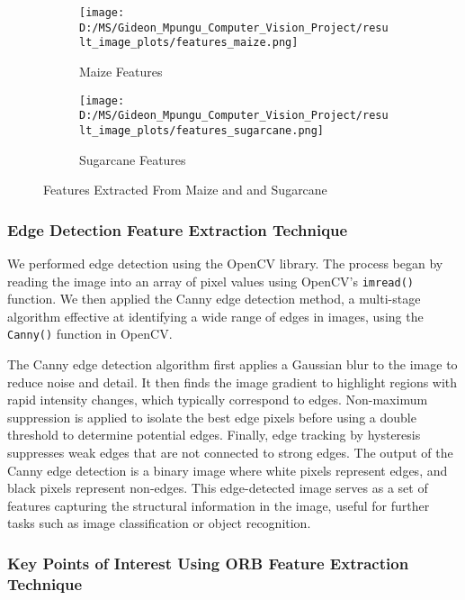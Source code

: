 \documentclass[10pt,twocolumn,letterpaper]{article}
\begin{document}
\begin{figure*}[ht]
    \centering
    
    \begin{subfigure}{0.45\textwidth}
        \texttt{[image: D:/MS/Gideon\_Mpungu\_Computer\_Vision\_Project/result\_image\_plots/features\_maize.png]}
        \caption{Maize Features}
        \label{fig:maize}
    \end{subfigure}
    \hfill
    \begin{subfigure}{0.45\textwidth}
        \texttt{[image: D:/MS/Gideon\_Mpungu\_Computer\_Vision\_Project/result\_image\_plots/features\_sugarcane.png]}
        \caption{Sugarcane Features}
        \label{fig:sugarcane}
    \end{subfigure}
    
    \caption{Features Extracted From Maize and and Sugarcane}
    \label{fig:features}
\end{figure*}

\subsubsection{Edge Detection Feature Extraction Technique}

We performed edge detection using the OpenCV library. The process began by reading the image into an array of pixel values using OpenCV’s \texttt{imread()} function. We then applied the Canny edge detection method, a multi-stage algorithm effective at identifying a wide range of edges in images, using the \texttt{Canny()} function in OpenCV.

The Canny edge detection algorithm first applies a Gaussian blur to the image to reduce noise and detail. It then finds the image gradient to highlight regions with rapid intensity changes, which typically correspond to edges. Non-maximum suppression is applied to isolate the best edge pixels before using a double threshold to determine potential edges. Finally, edge tracking by hysteresis suppresses weak edges that are not connected to strong edges. The output of the Canny edge detection is a binary image where white pixels represent edges, and black pixels represent non-edges. This edge-detected image serves as a set of features capturing the structural information in the image, useful for further tasks such as image classification or object recognition.

\subsubsection{Key Points of Interest Using ORB Feature Extraction Technique}
\end{document}
